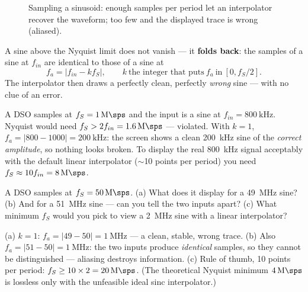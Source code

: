 \documentclass[11pt,a4paper,oneside]{book}
\begin{document}
\begin{figure}[h]\centering
{}
\caption{Sampling a sinusoid: enough samples per period let an interpolator
recover the waveform; too few and the displayed trace is wrong (aliased).}
\label{fig:sampling}
\end{figure}

\begin{keyidea}
A sine above the Nyquist limit does not vanish --- it \textbf{folds back}: the
samples of a sine at $f_{in}$ are identical to those of a sine at
\[
  f_a=\bigl|f_{in}-k f_S\bigr|,\qquad k\ \text{the integer that puts}\ f_a\
  \text{in}\ [0,f_S/2].
\]
The interpolator then draws a perfectly clean, perfectly \emph{wrong} sine ---
with no clue of an error.
\end{keyidea}

\begin{wexample}
A DSO samples at $f_S=\qty{1}{\mega\sps}$ and the input is a sine at
$f_{in}=\qty{800}{\kilo\hertz}$. Nyquist would need
$f_S>2f_{in}=\qty{1.6}{\mega\sps}$ --- violated. With $k=1$,
$f_a=|800-1000|=\qty{200}{\kilo\hertz}$: the screen shows a clean
\qty{200}{\kilo\hertz} sine of the \emph{correct amplitude}, so nothing looks
broken. To display the real \qty{800}{\kilo\hertz} signal acceptably with the
default linear interpolator ($\sim$10 points per period) you need
$f_S\approx10f_{in}=\qty{8}{\mega\sps}$.
\end{wexample}

\begin{exercise}
A DSO samples at $f_S=\qty{50}{\mega\sps}$. (a) What does it display for a
\qty{49}{\mega\hertz} sine? (b) And for a \qty{51}{\mega\hertz} sine --- can you
tell the two inputs apart? (c) What minimum $f_S$ would you pick to view a
\qty{2}{\mega\hertz} sine with a linear interpolator?
\end{exercise}
\begin{solution}
(a) $k=1$: $f_a=|49-50|=\qty{1}{\mega\hertz}$ --- a clean, stable, wrong trace.
(b) Also $f_a=|51-50|=\qty{1}{\mega\hertz}$: the two inputs produce
\emph{identical} samples, so they cannot be distinguished --- aliasing destroys
information. (c) Rule of thumb, 10 points per period:
$f_S\ge10\times2=\qty{20}{\mega\sps}$. (The theoretical Nyquist minimum
$\qty{4}{\mega\sps}$ is lossless only with the unfeasible ideal sinc
interpolator.)
\end{solution}
\end{document}

